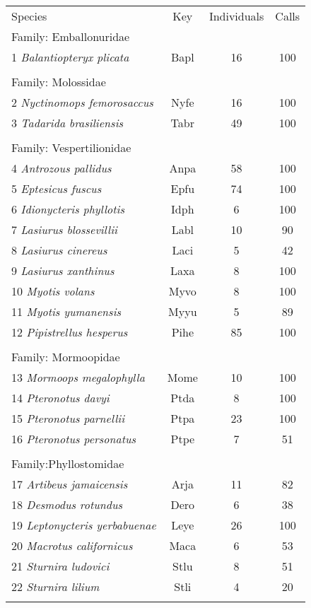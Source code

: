 \documentclass[wsdraft]{ws-rv9x6} %
\begin{document}
\begin{table}[ht]
	{\begin{tabular}{@{}lccc@{}} \toprule
		Species & Key & Individuals & Calls \\ \colrule
		Family: Emballonuridae &&& \\
		1 \textit{Balantiopteryx plicata} & Bapl & 16 & 100 \\
		\\
		Family: Molossidae &&& \\
		2 \textit{Nyctinomops femorosaccus} & Nyfe & 16 & 100 \\
		3 \textit{Tadarida brasiliensis} & Tabr & 49 & 100  \\
		\\
		Family: Vespertilionidae &&& \\
		4 \textit{Antrozous pallidus} & Anpa & 58 & 100 \\
		5 \textit{Eptesicus fuscus} & Epfu & 74 & 100 \\
		6 \textit{Idionycteris phyllotis} & Idph & 6 & 100 \\
		7 \textit{Lasiurus blossevillii} & Labl & 10 & 90 \\
		8 \textit{Lasiurus cinereus} & Laci & 5 & 42 \\
		9 \textit{Lasiurus xanthinus} & Laxa & 8 & 100 \\
		10 \textit{Myotis volans} & Myvo & 8 & 100 \\
		11 \textit{Myotis yumanensis} & Myyu & 5 & 89 \\
		12 \textit{Pipistrellus hesperus} & Pihe & 85 & 100 \\
		\\
		Family: Mormoopidae &&& \\
		13 \textit{Mormoops megalophylla} & Mome & 10 & 100 \\
		14 \textit{Pteronotus davyi} & Ptda & 8 & 100 \\
		15 \textit{Pteronotus parnellii} & Ptpa & 23 & 100 \\
		16 \textit{Pteronotus personatus} & Ptpe & 7 & 51 \\
		\\
		Family:Phyllostomidae &&& \\
		17 \textit{Artibeus jamaicensis} & Arja & 11 & 82 \\
		18 \textit{Desmodus rotundus} & Dero & 6 & 38 \\
		19 \textit{Leptonycteris yerbabuenae} & Leye & 26 & 100 \\
		20 \textit{Macrotus californicus} & Maca & 6 & 53 \\
		21 \textit{Sturnira ludovici} & Stlu & 8 & 51 \\
		22 \textit{Sturnira lilium} & Stli & 4 & 20 \\
		\botrule
		\end{tabular}
	}
	\label{tab::dataset}
\end{table}
\end{document}
